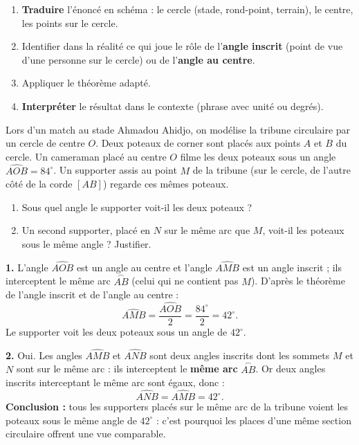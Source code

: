\documentclass[11pt]{article}
\begin{document}
\begin{methode}
\begin{enumerate}
\item \textbf{Traduire} l'énoncé en schéma : le cercle (stade, rond-point, terrain), le centre, les points sur le cercle.
\item Identifier dans la réalité ce qui joue le rôle de l'\textbf{angle inscrit} (point de vue d'une personne sur le cercle) ou de l'\textbf{angle au centre}.
\item Appliquer le théorème adapté.
\item \textbf{Interpréter} le résultat dans le contexte (phrase avec unité ou degrés).
\end{enumerate}
\end{methode}

\begin{exoresolu}
Lors d'un match au stade Ahmadou Ahidjo, on modélise la tribune circulaire par un cercle de centre $O$. Deux poteaux de corner sont placés aux points $A$ et $B$ du cercle. Un cameraman placé au centre $O$ filme les deux poteaux sous un angle $\widehat{AOB} = 84^\circ$. Un supporter assis au point $M$ de la tribune (sur le cercle, de l'autre côté de la corde $[AB]$) regarde ces mêmes poteaux.
\begin{enumerate}
\item Sous quel angle le supporter voit-il les deux poteaux ?
\item Un second supporter, placé en $N$ sur le même arc que $M$, voit-il les poteaux sous le même angle ? Justifier.
\end{enumerate}
\tcblower
\textbf{1.} L'angle $\widehat{AOB}$ est un angle au centre et l'angle $\widehat{AMB}$ est un angle inscrit ; ils interceptent le même arc $\overset{\frown}{AB}$ (celui qui ne contient pas $M$). D'après le théorème de l'angle inscrit et de l'angle au centre :
\[ \widehat{AMB} = \frac{\widehat{AOB}}{2} = \frac{84^\circ}{2} = 42^\circ. \]
Le supporter voit les deux poteaux sous un angle de $42^\circ$.

\textbf{2.} Oui. Les angles $\widehat{AMB}$ et $\widehat{ANB}$ sont deux angles inscrits dont les sommets $M$ et $N$ sont sur le même arc : ils interceptent le \textbf{même arc} $\overset{\frown}{AB}$. Or deux angles inscrits interceptant le même arc sont égaux, donc :
\[ \widehat{ANB} = \widehat{AMB} = 42^\circ. \]
\textbf{Conclusion :} tous les supporters placés sur le même arc de la tribune voient les poteaux sous le même angle de $42^\circ$ : c'est pourquoi les places d'une même section circulaire offrent une vue comparable.
\end{exoresolu}
\end{document}
